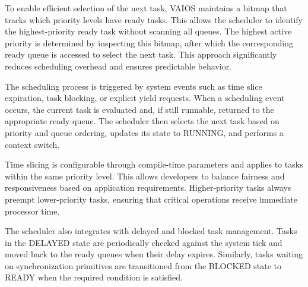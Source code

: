 To enable efficient selection of the next task, VAIOS maintains a bitmap that tracks which priority levels have ready tasks. This allows the scheduler to identify the highest-priority ready task without scanning all queues. The highest active priority is determined by inspecting this bitmap, after which the corresponding ready queue is accessed to select the next task. This approach significantly reduces scheduling overhead and ensures predictable behavior.

The scheduling process is triggered by system events such as time slice expiration, task blocking, or explicit yield requests. When a scheduling event occurs, the current task is evaluated and, if still runnable, returned to the appropriate ready queue. The scheduler then selects the next task based on priority and queue ordering, updates its state to RUNNING, and performs a context switch.

Time slicing is configurable through compile-time parameters and applies to tasks within the same priority level. This allows developers to balance fairness and responsiveness based on application requirements. Higher-priority tasks always preempt lower-priority tasks, ensuring that critical operations receive immediate processor time.

The scheduler also integrates with delayed and blocked task management. Tasks in the DELAYED state are periodically checked against the system tick and moved back to the ready queues when their delay expires. Similarly, tasks waiting on synchronization primitives are transitioned from the BLOCKED state to READY when the required condition is satisfied.
